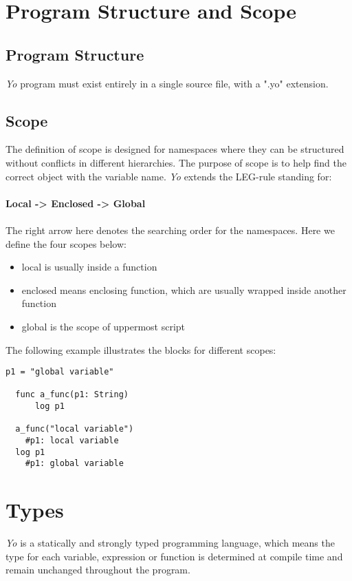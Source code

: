 \documentclass[12pt]{article}
\begin{document}
\section{Program Structure and Scope} %

\subsection{Program Structure} %
\textit{Yo} program must exist entirely in a single source file, with a ".yo" extension.
\subsection{Scope} %
The definition of scope is designed for namespaces where they can be structured without conflicts in different hierarchies. The purpose of scope is to help find the correct object with the variable name. \textit{Yo} extends the LEG-rule standing for: \\ \\
\textbf{Local -> Enclosed -> Global} \\ \\
The right arrow here denotes the searching order for the namespaces. Here we define the four scopes below:
\begin{itemize}
  \item local is usually inside a function
    \item enclosed means enclosing function, which are usually wrapped inside another function
    \item global is the scope of uppermost script
\end{itemize}
The following example illustrates the  blocks for different scopes:

\begin{lstlisting}[caption=Scope]
  p1 = "global variable"
 
  func a_func(p1: String)
      log p1
 
  a_func("local variable")
    #p1: local variable 
  log p1
    #p1: global variable
\end{lstlisting}

\section{Types}
\textit{Yo} is a statically and strongly typed programming language, which means the type for each variable, expression or function is determined at compile time and remain unchanged throughout the program.\\
\end{document}

